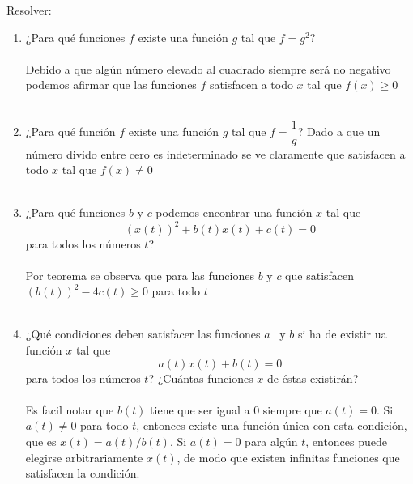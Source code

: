 \begin{ej} Resolver: 
\begin{enumerate}[\bfseries a)]
\item ¿Para qué funciones $f$ existe una función $g$ tal que $f=g^2$?\\\\
Debido a que algún número elevado al cuadrado siempre será no negativo podemos afirmar que las funciones $f$ satisfacen a todo $x$ tal que $f(x)\geq 0$\\\\

\item ¿Para qué función $f$ existe una función $g$ tal que $f=\dfrac{1}{g}$?
Dado a que un número divido entre cero es indeterminado se ve claramente que satisfacen a todo $x$ tal que $f(x)\neq 0$\\\\

\item ¿Para qué funciones $b$ \; y \; $c$ podemos encontrar una función $x$ tal que $$(x(t))^2 + b(t)x(t) + c(t) =0$$ para todos los números $t$?\\\\
Por teorema se observa que para las funciones $b$ \; y \; $c$ que satisfacen $(b(t))^2 - 4c(t) \geq 0$ para todo $t$\\\\ 

\item ¿Qué condiciones deben satisfacer las funciones $a$ \, y \; $b$ si ha de existir ua función $x$ tal que $$a(t)x(t)+ b(t) = 0$$ para todos los números $t$? ¿Cuántas funciones $x$ de éstas existirán?\\\\
Es facil notar que $b(t)$ tiene que ser igual a $0$ siempre que $a(t) = 0$. Si $a(t) \neq 0$ para todo $t$, entonces existe una función única con esta condición, que es $x(t) = a(t)/b(t)$. Si $a(t)=0$ para algún $t$, entonces puede elegirse arbitrariamente $x(t)$, de modo que existen infinitas funciones que satisfacen la condición.\\\\


\end{enumerate}
\end{ej}

